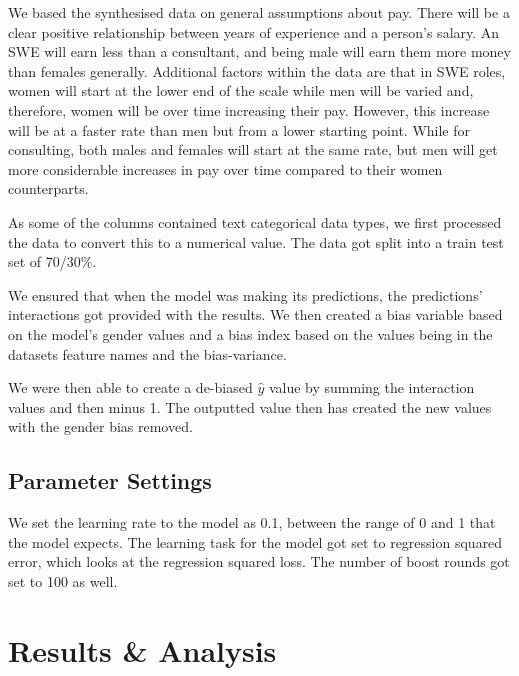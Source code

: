\documentclass{sigchi}
\begin{document}
	We based the synthesised data on general assumptions about pay. There will be a clear positive relationship between years of experience and a person's salary. An SWE will earn less than a consultant, and being male will earn them more money than females generally. Additional factors within the data are that in SWE roles, women will start at the lower end of the scale while men will be varied and, therefore, women will be over time increasing their pay. However, this increase will be at a faster rate than men but from a lower starting point. While for consulting, both males and females will start at the same rate, but men will get more considerable increases in pay over time compared to their women counterparts. 
	
	As some of the columns contained text categorical data types, we first processed the data to convert this to a numerical value. The data got split into a train test set of 70/30\%. 
	
	We ensured that when the model was making its predictions, the predictions' interactions got provided with the results. We then created a bias variable based on the model's gender values and a bias index based on the values being in the datasets feature names and the bias-variance. 
	
	We were then able to create a de-biased $\hat{y}$ value by summing the interaction values and then minus 1. The outputted value then has created the new values with the gender bias removed.




\subsection{Parameter Settings}
	We set the learning rate to the model as 0.1, between the range of 0 and 1 that the model expects. The learning task for the model got set to regression squared error, which looks at the regression squared loss. The number of boost rounds got set to 100 as well.

\section{Results \& Analysis}
	
\end{document}
